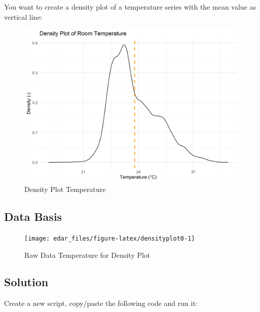 \documentclass[
  a4paperpaper,
]{book}
\begin{document}
You want to create a density plot of a temperature series with the mean value as vertical line:

\begin{figure}
\includegraphics[width=0.7\linewidth]{images/plotDensity} \caption{Density Plot Temperature}\label{fig:unnamed-chunk-11}
\end{figure}

\hypertarget{data-basis-2}{%
\subsection{Data Basis}\label{data-basis-2}}

\begin{figure}
\texttt{[image: edar\_files/figure-latex/densityplot0-1]} \caption{Raw Data Temperature for Density Plot}\label{fig:densityplot0}
\end{figure}
\newpage

\hypertarget{solution-2}{%
\subsection{Solution}\label{solution-2}}

Create a new script, copy/paste the following code and run it:
\end{document}
